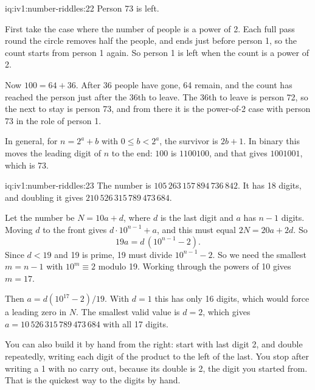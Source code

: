 \enlargethispage{-3\baselineskip}%
\begin{solution}{iq:iv1:number-riddles:22}
Person 73 is left.

First take the case where the number of people is a power of 2. Each full pass round the circle removes half the people, and ends just before person 1, so the count starts from person 1 again. So person 1 is left when the count is a power of 2.

Now $100 = 64 + 36$. After 36 people have gone, 64 remain, and the count has reached the person just after the 36th to leave. The 36th to leave is person 72, so the next to stay is person 73, and from there it is the power-of-2 case with person 73 in the role of person 1.

In general, for $n = 2^a + b$ with $0 \le b < 2^a$, the survivor is $2b + 1$. In binary this moves the leading digit of $n$ to the end: $100$ is $1100100$, and that gives $1001001$, which is 73.

\end{solution}

\begin{solution}{iq:iv1:number-riddles:23}
The number is $105\,263\,157\,894\,736\,842$. It has 18 digits, and doubling it gives $210\,526\,315\,789\,473\,684$.

Let the number be $N = 10a + d$, where $d$ is the last digit and $a$ has $n - 1$ digits. Moving $d$ to the front gives $d \cdot 10^{n-1} + a$, and this must equal $2N = 20a + 2d$. So
\[
19a = d \,(10^{n-1} - 2).
\]
Since $d < 19$ and 19 is prime, 19 must divide $10^{n-1} - 2$. So we need the smallest $m = n - 1$ with $10^m \equiv 2$ modulo 19. Working through the powers of 10 gives $m = 17$.

Then $a = d(10^{17} - 2)/19$. With $d = 1$ this has only 16 digits, which would force a leading zero in $N$. The smallest valid value is $d = 2$, which gives $a = 10\,526\,315\,789\,473\,684$ with all 17 digits.

You can also build it by hand from the right: start with last digit 2, and double repeatedly, writing each digit of the product to the left of the last. You stop after writing a 1 with no carry out, because its double is 2, the digit you started from. That is the quickest way to the digits by hand.

\end{solution}

